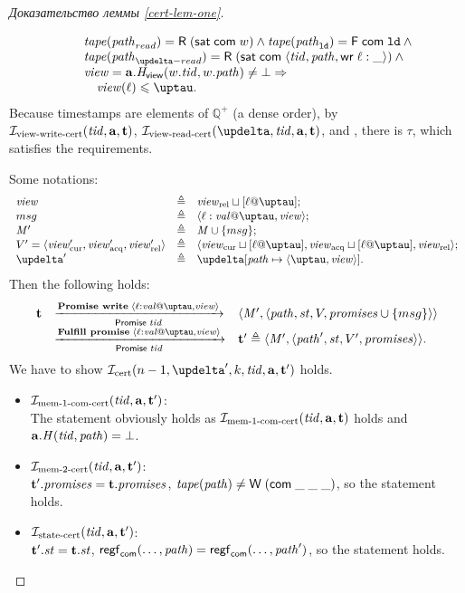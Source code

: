 \begin{proof}[Доказательство леммы \ref{cert-lem-one}]
\begin{itemize}
\[\begin{array}{l l}
           & \quad \tape(\cpath_{read}) = \tapeRead{(\tapeSatisfied{\Committed}{\w})} \land
             \tape(\cpath_{\LD}) = \tapeFence{\Committed}{\LD} \land {} \\
           & \quad \tape(\cpath_{\delta-read}) = \tapeRead{(\tapeSatisfied{\Committed}{\stRequestWrite{\tId}{\cpath}\loc}{\_})} \land {} \\
           & \quad \R = \aT.\rmap(\w.\tId, \w.\cpath) \not = \bot \Rightarrow \\
           & \qquad \R(\loc) \le \tau. \\
      \end{array}\]
      Because timestamps are elements of $\mathbb{Q}^{+}$ (a dense order), by $\mathcal{I}_{\textup{\rm view-write-cert}}(\mathit{tid}, \mathbf{a}, \mathbf{t})$,
      $\invViewReadCERT(\delta, \tId, \aT, \tT)$, and \app{\ref{thm:invAview}}, there is $\tau$, which satisfies the requirements.

      Some notations:
      \[\begin{array}{l l l}
        \R  & \triangleq & \Rrel \sqcup [\loc @ \tau]; \\
        msg & \triangleq & \writeEvt{\loc}{\stval}{\tau}{\R}; \\
        \Mprom' & \triangleq & \Mprom \cup \{msg\};\\
        \V' = \angled{\Rcur', \Racq', \Rrel'} & \triangleq & \angled{\Rcur \sqcup [\loc @ \tau], \Racq \sqcup [\loc @ \tau], \Rrel}; \\
        \delta' & \triangleq & \delta[\cpath \mapsto \angled{\tau, \R}].\\ 
      \end{array}\]
      Then the following holds:
      \[\begin{array}{l l l}
        \tT & \promTStepPromiseLoc & \angled{\Mprom', \angled{\cpath , \PromState, \V, \PromSet \cup \{msg\}}} \\
            & \promTStepFulfillLoc & \tT' \triangleq \angled{\Mprom', \angled{\cpath', \PromState, \V', \PromSet}}. \\
      \end{array}\]
      We have to show $\invCert(n - 1, \delta', k, \tId, \aT, \tT')$ holds.
      
      \begin{itemize}
        \item $\mathcal{I}_{\textup{\rm mem-1-com-cert}}(\mathit{tid}, \mathbf{a}, \mathbf{t}')$: \\
          The statement obviously holds as $\mathcal{I}_{\textup{\rm mem-1-com-cert}}(\mathit{tid}, \mathbf{a}, \mathbf{t})$ holds and $\mathbf{a}.\mathit{H}(\mathit{tid}, \mathit{path}) = \bot$.
        \item $\mathcal{I}_{\textup{\rm mem-2-cert}}(\mathit{tid}, \mathbf{a}, \mathbf{t}')$: \\
          $\mathbf{t}'.\mathit{promises} = \mathbf{t}.\mathit{promises}$, $\mathit{tape}(\mathit{path}) \not = \textsf{W} \; (\mathsf{com} \; \_ \; \_ \; \_)$,
          so the statement holds.
        \item $\mathcal{I}_{\textup{\rm state-cert}}(\mathit{tid}, \mathbf{a}, \mathbf{t}')$: \\
          $\mathbf{t}'.\mathit{st} = \mathbf{t}.\mathit{st}$, $\mathsf{regf}_\mathsf{com}(\dots, \mathit{path}) = \mathsf{regf}_\mathsf{com}(\dots, \mathit{path}')$, so the statement holds.


\end{itemize}
\end{itemize}
\end{proof}
